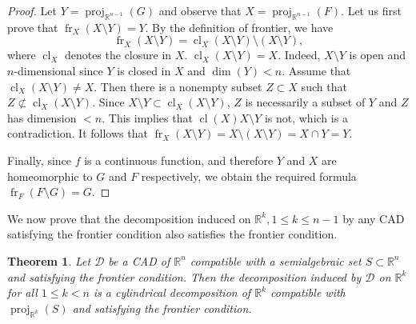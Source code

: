 \documentclass[
]{book}
\newtheorem{theorem}{Theorem}[chapter]
\theoremstyle{definition}
\theoremstyle{definition}
\theoremstyle{definition}
\theoremstyle{definition}
\theoremstyle{remark}
\begin{document}
\begin{proof}
Let \(Y = \operatorname{proj}_{\mathbb{R}^{n-1}}(G)\) and observe that \(X = \operatorname{proj}_{\mathbb{R}^{n-1}}(F)\).
Let us first prove that \({\operatorname{fr}_{X} \left( X \setminus Y \right)} = Y\).
By the definition of frontier, we have
\[{\operatorname{fr}_{X} \left( X \setminus Y \right)}={\operatorname{cl}_{X} \left( X \setminus Y \right)} \setminus (X \setminus Y),\]
where \(\operatorname{cl}_X\) denotes the closure in \(X\).
\({\operatorname{cl}_{X} \left( X \setminus Y \right)}=X\). Indeed, \(X\setminus Y\) is open and \(n\)-dimensional since \(Y\) is closed in \(X\) and \(\dim(Y)<n\).
Assume that \({\operatorname{cl}_{X} \left( X \setminus Y \right)} \ne X\). Then there is a nonempty subset \(Z\subset X\) such that \(Z \not \subset {\operatorname{cl}_{X} \left( X \setminus Y \right)}\). Since \(X \setminus Y \subset {\operatorname{cl}_{X} \left( X \setminus Y \right)}\), \(Z\) is necessarily a subset of \(Y\) and \(Z\) has dimension \(<n\). This implies that \({\operatorname{cl} \left( X \right)}{X\setminus Y}\) is not, which is a contradiction.
It follows that \({\operatorname{fr}_{X} \left( X \setminus Y \right)}=X \setminus (X \setminus Y)= X \cap Y = Y\).

Finally, since \(f\) is a continuous function, and therefore \(Y\) and \(X\) are homeomorphic to \(G\) and \(F\)
respectively, we obtain the required formula \({\operatorname{fr}_{F} \left( F \setminus G \right)} = G\).
\end{proof}

We now prove that the decomposition induced on \(\mathbb{R}^k, 1 \le k \le n-1\) by any CAD satisfying the frontier condition also satisfies the frontier condition.

\begin{theorem}
\protect\hypertarget{thm:novel-frontier-proj}{}\label{thm:novel-frontier-proj}Let \(\mathcal{D}\) be a CAD of \(\mathbb{R}^n\) compatible with a semialgebraic set \(S\subset \mathbb{R}^n\) and satisfying the frontier condition.
Then the decomposition induced by \(\mathcal{D}\) on \(\mathbb{R}^{k}\) for all \(1\le k < n\) is a cylindrical decomposition of \(\mathbb{R}^k\) compatible with \(\operatorname{proj}_{\mathbb{R}^k}(S)\) and satisfying the frontier condition.
\end{theorem}
\end{document}
